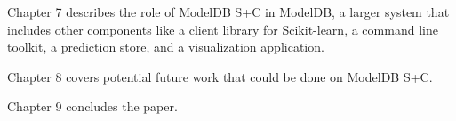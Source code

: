 Chapter 7 describes the role of ModelDB S+C in ModelDB,
a larger system that includes other components like a client library for Scikit-learn,
a command line toolkit, a prediction store, and a visualization application.

Chapter 8 covers potential future work that could be done on ModelDB S+C.

Chapter 9 concludes the paper.
